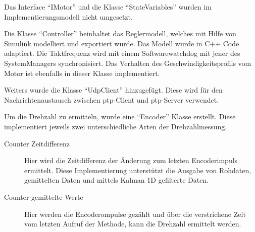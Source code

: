 \documentclass[./\jobname.tex]{subfiles}
\begin{document}
%
Das Interface \enquote{IMotor} und die Klasse \enquote{StateVariables} wurden im Implementierungsmodell nicht umgesetzt.\par
%
Die Klasse \enquote{Controller} beinhaltet das Reglermodell, welches mit Hilfe von Simulink modelliert und exportiert wurde. Das Modell wurde in C++ Code adaptiert. Die Taktfrequenz wird mit einem Softwarewatchdog mit jener des SystemManagers synchronisiert. Das Verhalten des Geschwindigkeitsprofils vom Motor ist ebenfalls in dieser Klasse implementiert.\par
%
Weiters wurde die Klasse \enquote{UdpClient} hinzugefügt. Diese wird für den Nachrichtenaustausch zwischen \acrshort{ptp}-Client und \acrshort{ptp}-Server verwendet.\par
%
Um die Drehzahl zu ermitteln, wurde eine \enquote{Encoder} Klasse erstellt. Diese implementiert jeweils zwei unterschiedliche Arten der Drehzahlmessung.
\begin{description}
	\item[Counter Zeitdifferenz] Hier wird die Zeitdifferenz der Änderung zum letzten Encoderimpuls ermittelt. Diese Implementierung unterstützt die Ausgabe von Rohdaten, gemittelten Daten und mittels Kalman 1D gefilterte Daten.
	\item[Counter gemittelte Werte] Hier werden die Encoderompulse gezählt und über die verstrichene Zeit vom letzten Aufruf der Methode, kann die Drehzahl ermittelt werden.
\end{description}
%
\end{document}

